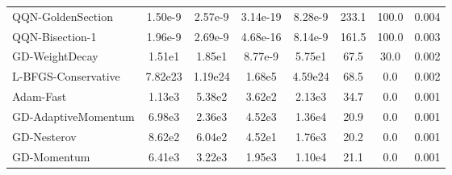 \documentclass{article}
\begin{document}
\begin{table}[htbp]
{\begin{tabular}{p{2.5cm}*{7}{c}}
QQN-GoldenSection & 1.50e-9 & 2.57e-9 & 3.14e-19 & 8.28e-9 & 233.1 & 100.0 & 0.004 \\
QQN-Bisection-1 & 1.96e-9 & 2.69e-9 & 4.68e-16 & 8.14e-9 & 161.5 & 100.0 & 0.003 \\
GD-WeightDecay & 1.51e1 & 1.85e1 & 8.77e-9 & 5.75e1 & 67.5 & 30.0 & 0.002 \\
L-BFGS-Conservative & 7.82e23 & 1.19e24 & 1.68e5 & 4.59e24 & 68.5 & 0.0 & 0.002 \\
Adam-Fast & 1.13e3 & 5.38e2 & 3.62e2 & 2.13e3 & 34.7 & 0.0 & 0.001 \\
GD-AdaptiveMomentum & 6.98e3 & 2.36e3 & 4.52e3 & 1.36e4 & 20.9 & 0.0 & 0.001 \\
GD-Nesterov & 8.62e2 & 6.04e2 & 4.52e1 & 1.76e3 & 20.2 & 0.0 & 0.001 \\
GD-Momentum & 6.41e3 & 3.22e3 & 1.95e3 & 1.10e4 & 21.1 & 0.0 & 0.001 \\
\bottomrule
\end{tabular}
}
\end{table}
\end{document}
